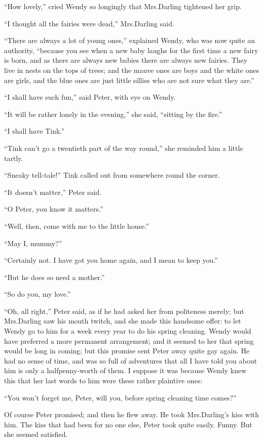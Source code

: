 “How lovely,” cried Wendy so longingly that Mrs.\@ Darling tightened her grip.

“I thought all the fairies were dead,” Mrs.\@ Darling said.

“There are always a lot of young ones,” explained Wendy, who was now quite an authority,
“because you see when a new baby laughs for the first time a new fairy is born,
and as there are always new babies there are always new fairies.
They live in nests on the tops of trees;
and the mauve ones are boys and the white ones are girls,
and the blue ones are just little sillies who are not sure what they are.”

“I shall have such fun,” said Peter, with eye on Wendy.

“It will be rather lonely in the evening,” she said, “sitting by the fire.”

“I shall have Tink.”

“Tink can’t go a twentieth part of the way round,” she reminded him a little tartly.

“Sneaky tell-tale!\@” Tink called out from somewhere round the corner.

“It doesn’t matter,” Peter said.

“O Peter, you know it matters.”

“Well, then, come with me to the little house.”

“May I, mummy?”

“Certainly not.
I have got you home again, and I mean to keep you.”

“But he does so need a mother.”

“So do you, my love.”

“Oh, all right,” Peter said, as if he had asked her from politeness merely;
but Mrs.\@ Darling saw his mouth twitch, and she made this handsome offer:
to let Wendy go to him for a week every year to do his spring cleaning.
Wendy would have preferred a more permanent arrangement;
and it seemed to her that spring would be long in coming;
but this promise sent Peter away quite gay again.
He had no sense of time,
and was so full of adventures that all I have told you about him is only a halfpenny-worth of them.
I suppose it was because Wendy knew this that her last words to him were these rather plaintive ones:

“You won’t forget me, Peter, will you,
before spring cleaning time comes?”

Of course Peter promised;
and then he flew away.
He took Mrs.\@ Darling’s kiss with him.
The kiss that had been for no one else, Peter took quite easily.
Funny.
But she seemed satisfied.


